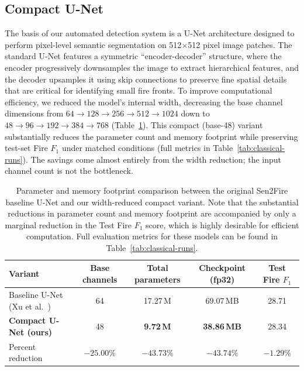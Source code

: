 \documentclass{article}
\begin{document}
\subsection{Compact U-Net}
\label{sec:compactunet}

The basis of our automated detection system is a U-Net architecture designed to perform pixel-level semantic segmentation on 512$\times$512 pixel image patches. The standard U-Net features a symmetric ``encoder-decoder'' structure, where the encoder progressively downsamples the image to extract hierarchical features, and the decoder upsamples it using skip connections to preserve fine spatial details that are critical for identifying small fire fronts. To improve computational efficiency, we reduced the model's internal width, decreasing the base channel dimensions from $64 \rightarrow 128 \rightarrow 256 \rightarrow 512 \rightarrow 1024$ down to $48 \rightarrow 96 \rightarrow 192 \rightarrow 384 \rightarrow 768$ (Table~\ref{tab:param-counts}). This compact (base-48) variant substantially reduces the parameter count and memory footprint while preserving test-set Fire $F_1$ under matched conditions (full metrics in Table~\ref{tab:classical-runs}). The savings come almost entirely from the width reduction; the input channel count is not the bottleneck.

\begin{table}[H]
    \centering
    \begin{tabular}{lcccc}
        \toprule
        Variant & Base channels & Total parameters & Checkpoint (fp32) & Test Fire $F_1$ \\
        \midrule
        Baseline U-Net (Xu et al.~\cite{sen2fire}) & 64 & 17.27\,M & 69.07\,MB & 28.71 \\
        \textbf{Compact U-Net (ours)}              & 48 & \textbf{9.72\,M} & \textbf{38.86\,MB} & 28.34 \\
        \midrule
        Percent reduction                          & $-25.00\%$ & $-43.73\%$ & $-43.74\%$ & $-1.29\%$ \\
        \bottomrule
    \end{tabular}
    \caption{Parameter and memory footprint comparison between the original Sen2Fire baseline U-Net and our width-reduced compact variant. Note that the substantial reductions in parameter count and memory footprint are accompanied by only a marginal reduction in the Test Fire $F_1$ score, which is highly desirable for efficient computation. Full evaluation metrics for these models can be found in Table~\ref{tab:classical-runs}.}
    \label{tab:param-counts}
\end{table}
\end{document}
